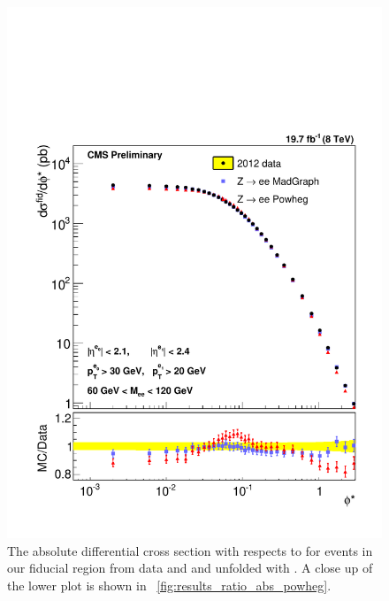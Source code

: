 \begin{figure}[!p]
    \centering
    \includegraphics[width=\textwidth]{figures/ZShape_elec_PH_Abs_Dressed.pdf}
    \caption[
        The absolute differential cross section with respects to \phistar for
        \Ztoee events in our fiducial region from data and \MADGRAPH and
        \POWHEG unfolded with \POWHEG.
    ]{
        The absolute differential cross section with respects to \phistar for
        \Ztoee events in our fiducial region from data and \MADGRAPH and
        \POWHEG unfolded with \POWHEG. A close up of the lower plot is shown in
        \FIG~\ref{fig:results_ratio_abs_powheg}.
    }
    \label{fig:results_abs_powheg}
\end{figure}

